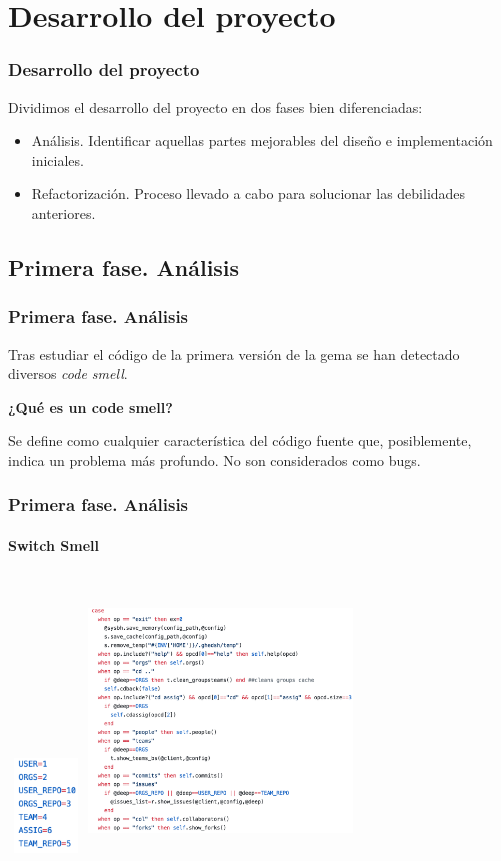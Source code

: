 \documentclass{beamer}
\begin{document}
\section{Desarrollo del proyecto}
\begin{frame}
\frametitle{Desarrollo del proyecto}
  Dividimos el desarrollo del proyecto en dos fases bien diferenciadas:
  \begin{itemize}
    \item Análisis. Identificar aquellas partes mejorables del diseño e implementación iniciales.
    \item Refactorización. Proceso llevado a cabo para solucionar las debilidades anteriores.
  \end{itemize}
\end{frame}

\subsection{Primera fase. Análisis}
\begin{frame}[fragile]
\frametitle{Primera fase. Análisis}
  Tras estudiar el código de la primera versión de la gema se han detectado diversos {\it code smell}.
  \bigskip

  \textbf{¿Qué es un code smell?}
  \bigskip

  Se define como cualquier característica del código fuente que, posiblemente, 
  indica un problema más profundo. No son considerados como bugs.
\end{frame}

\begin{frame}
\frametitle{Primera fase. Análisis}
\framesubtitle{Switch Smell}

  \begin{columns}
      \includegraphics[height=2.5cm, width=2cm]{img/constantes.png}
    \includegraphics[height=7cm, width=7cm]{img/switch-smell.png}
  \end{columns}

\end{frame}
\end{document}

